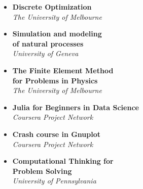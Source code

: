 \documentclass[a4paper,11pt]{article}
\begin{document}





\begingroup
\small

\begin{multicols}{2}
    \begin{itemize}[itemsep=0pt, parsep=3pt, label=\faCaretRight]

      \item \parbox[t]{\linewidth}{\textbf{Discrete Optimization} \\
            \emph{The University of Melbourne}}

      \item \parbox[t]{\linewidth}{\textbf{Simulation and modeling} \\
            \textbf{of natural processes} \\
            \emph{University of Geneva}}

      \item \parbox[t]{\linewidth}{\textbf{The Finite Element Method} \\
            \textbf{ for Problems in Physics} \\
            \emph{The University of Melbourne}}

      \item \parbox[t]{\linewidth}{\textbf{Julia for Beginners in Data Science} \\
            \emph{Coursera Project Network }}

      \item \parbox[t]{\linewidth}{\textbf{Crash course in Gnuplot} \\
            \emph{Coursera Project Network }}

      \item \parbox[t]{\linewidth}{\textbf{Computational Thinking for} \\
            \textbf{Problem Solving} \\
            \emph{University of Pennsylvania}}

    \end{itemize}
\end{multicols}
\end{document}
